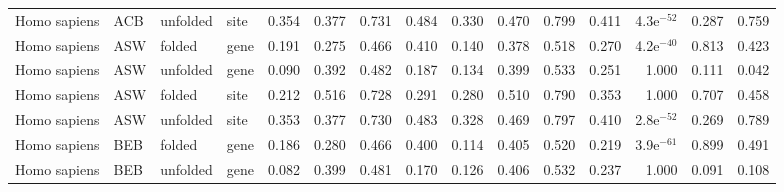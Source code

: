 \begin{longtable}{llllrrrrrrrrrrr}
        Homo sapiens &                       ACB &  unfolded &  site &                              0.354 &                               0.377 &                 0.731 &                 0.484 &                              0.330 &                               0.470 &                 0.799 &                 0.411 &  4.3e$^{-52}$ &  0.287 &  0.759 \\
        Homo sapiens &                       ASW &    folded &  gene &                              0.191 &                               0.275 &                 0.466 &                 0.410 &                              0.140 &                               0.378 &                 0.518 &                 0.270 &  4.2e$^{-40}$ &  0.813 &  0.423 \\
        Homo sapiens &                       ASW &  unfolded &  gene &                              0.090 &                               0.392 &                 0.482 &                 0.187 &                              0.134 &                               0.399 &                 0.533 &                 0.251 &         1.000 &  0.111 &  0.042 \\
        Homo sapiens &                       ASW &    folded &  site &                              0.212 &                               0.516 &                 0.728 &                 0.291 &                              0.280 &                               0.510 &                 0.790 &                 0.353 &         1.000 &  0.707 &  0.458 \\
        Homo sapiens &                       ASW &  unfolded &  site &                              0.353 &                               0.377 &                 0.730 &                 0.483 &                              0.328 &                               0.469 &                 0.797 &                 0.410 &  2.8e$^{-52}$ &  0.269 &  0.789 \\
        Homo sapiens &                       BEB &    folded &  gene &                              0.186 &                               0.280 &                 0.466 &                 0.400 &                              0.114 &                               0.405 &                 0.520 &                 0.219 &  3.9e$^{-61}$ &  0.899 &  0.491 \\
        Homo sapiens &                       BEB &  unfolded &  gene &                              0.082 &                               0.399 &                 0.481 &                 0.170 &                              0.126 &                               0.406 &                 0.532 &                 0.237 &         1.000 &  0.091 &  0.108 \\

\end{longtable}
